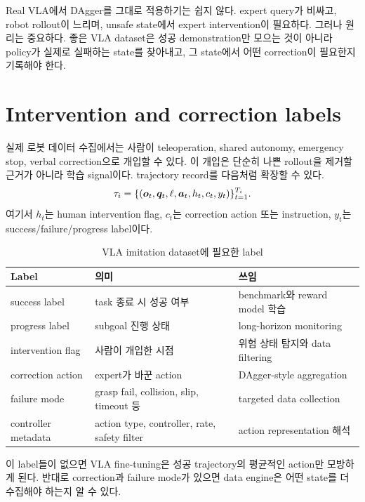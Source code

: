 Real VLA에서 DAgger를 그대로 적용하기는 쉽지 않다. expert query가 비싸고, robot rollout이 느리며, unsafe state에서 expert intervention이 필요하다. 그러나 원리는 중요하다. 좋은 VLA dataset은 성공 demonstration만 모으는 것이 아니라 policy가 실제로 실패하는 state를 찾아내고, 그 state에서 어떤 correction이 필요한지 기록해야 한다.

\section{Intervention and correction labels}

실제 로봇 데이터 수집에서는 사람이 teleoperation, shared autonomy, emergency stop, verbal correction으로 개입할 수 있다. 이 개입은 단순히 나쁜 rollout을 제거할 근거가 아니라 학습 signal이다. trajectory record를 다음처럼 확장할 수 있다.
\begin{equation}
  \tau_i
  =
  \{(\bm{o}_t,\bm{q}_t,\ell,\bm{a}_t,h_t,c_t,y_t)\}_{t=1}^{T_i}.
  \label{eq:intervention-trajectory}
\end{equation}
여기서 $h_t$는 human intervention flag, $c_t$는 correction action 또는 instruction, $y_t$는 success/failure/progress label이다.

\begin{table}[ht]
\centering
\caption{VLA imitation dataset에 필요한 label}
\label{tab:vla-imitation-labels}
\small
\begin{tabularx}{\textwidth}{p{30mm}X X}
\toprule
Label & 의미 & 쓰임 \\
\midrule
success label & task 종료 시 성공 여부 & benchmark와 reward model 학습 \\
progress label & subgoal 진행 상태 & long-horizon monitoring \\
intervention flag & 사람이 개입한 시점 & 위험 상태 탐지와 data filtering \\
correction action & expert가 바꾼 action & DAgger-style aggregation \\
failure mode & grasp fail, collision, slip, timeout 등 & targeted data collection \\
controller metadata & action type, controller, rate, safety filter & action representation 해석 \\
\bottomrule
\end{tabularx}
\end{table}

이 label들이 없으면 VLA fine-tuning은 성공 trajectory의 평균적인 action만 모방하게 된다. 반대로 correction과 failure mode가 있으면 data engine은 어떤 state를 더 수집해야 하는지 알 수 있다.

